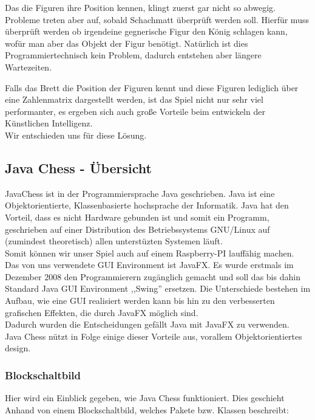 \documentclass[12pt,a4paper]{article}
\begin{document}
{Das die Figuren ihre Position kennen, klingt zuerst gar nicht so abwegig. Probleme treten aber auf, sobald Schachmatt überprüft werden soll. Hierfür muss überprüft werden ob irgendeine gegnerische Figur den König schlagen kann, wofür man aber das Objekt der Figur benötigt. Natürlich ist dies Programmiertechnisch kein Problem, dadurch entstehen aber längere Wartezeiten. 


Falls das Brett die Position der Figuren kennt und diese Figuren lediglich über eine Zahlenmatrix dargestellt werden, ist das Spiel nicht nur sehr viel performanter, es ergeben sich auch große Vorteile beim entwickeln der Künstlichen Intelligenz. \\ 
Wir entschieden uns für diese Lösung.

\subsection{Java Chess - Übersicht}

JavaChess ist in der Programmiersprache Java geschrieben. Java ist eine Objektorientierte, Klassenbasierte hochsprache der Informatik. Java hat den Vorteil, dass es nicht Hardware gebunden ist und somit ein Programm, geschrieben auf einer Distribution des Betriebssystems GNU/Linux auf (zumindest theoretisch) allen unterstüzten Systemen läuft. \\
Somit können wir unser Spiel auch auf einem Raspberry-PI lauffähig machen. \\
Das von uns verwendete GUI Environment ist JavaFX. Es wurde erstmals im Dezember 2008 den Programmierern zugänglich gemacht und soll das bis dahin Standard Java GUI Environment ,,Swing'' ersetzen. Die Unterschiede bestehen im Aufbau, wie eine GUI realisiert werden kann bis hin zu den verbesserten grafischen Effekten, die durch JavaFX möglich sind. \\

Dadurch wurden die Entscheidungen gefällt Java mit JavaFX zu verwenden.\\
Java Chess nützt in Folge einige dieser Vorteile aus, vorallem Objektorientiertes design. 


\subsubsection{Blockschaltbild}
\label{SUBSUBSEC:BLOCKSCHALTBILD}

Hier wird ein Einblick gegeben, wie Java Chess funktioniert. Dies geschieht Anhand von einem Blockschaltbild, welches Pakete bzw. Klassen beschreibt: 

}
\end{document}
